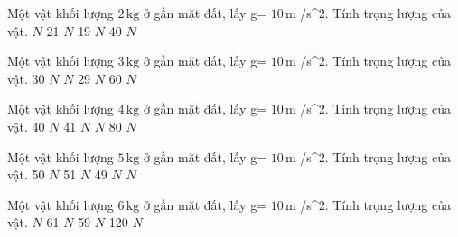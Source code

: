 

\begin{ex}
Một vật khối lượng $2\,\text{kg}$ ở gần mặt đất, lấy g= $10\,\text{m}$ /s^2. Tính trọng lượng của vật.
\choice
{ $N$}
{21 $N$}
{19 $N$}
{40 $N$}
\end{ex}

\begin{ex}
Một vật khối lượng $3\,\text{kg}$ ở gần mặt đất, lấy g= $10\,\text{m}$ /s^2. Tính trọng lượng của vật.
\choice
{30 $N$}
{ $N$}
{29 $N$}
{60 $N$}
\end{ex}

\begin{ex}
Một vật khối lượng $4\,\text{kg}$ ở gần mặt đất, lấy g= $10\,\text{m}$ /s^2. Tính trọng lượng của vật.
\choice
{40 $N$}
{41 $N$}
{ $N$}
{80 $N$}
\end{ex}

\begin{ex}
Một vật khối lượng $5\,\text{kg}$ ở gần mặt đất, lấy g= $10\,\text{m}$ /s^2. Tính trọng lượng của vật.
\choice
{50 $N$}
{51 $N$}
{49 $N$}
{ $N$}
\end{ex}

\begin{ex}
Một vật khối lượng $6\,\text{kg}$ ở gần mặt đất, lấy g= $10\,\text{m}$ /s^2. Tính trọng lượng của vật.
\choice
{ $N$}
{61 $N$}
{59 $N$}
{120 $N$}
\end{ex}

